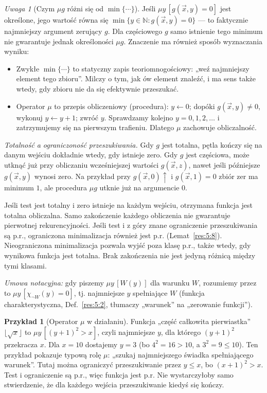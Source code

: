 \documentclass[11pt,a4paper]{article}
\numberwithin{equation}{section}
\theoremstyle{plain}
\theoremstyle{definition}
\newtheorem{przyklad}[twierdzenie]{Przykład}
\theoremstyle{remark}
\newtheorem{uwaga}[twierdzenie]{Uwaga}
\begin{document}
\begin{uwaga}[Czym $\mu g$ różni się od $\min\{\cdots\}$]\label{res:5:6}
Jeśli $\mu y\,[g(\vec x,y)=0]$ jest określone, jego wartość równa się $\min\{y\in\mathbb N:g(\vec x,y)=0\}$ --- to faktycznie najmniejszy argument zerujący $g$. Dla częściowego $g$ samo istnienie tego minimum nie gwarantuje jednak określoności $\mu g$. Znaczenie ma również sposób wyznaczania wyniku:
\begin{itemize}
\item Zwykłe $\min\{\cdots\}$ to statyczny zapis teoriomnogościowy: „weź najmniejszy element tego zbioru”. Milczy o tym, jak ów element znaleźć, i ma sens także wtedy, gdy zbioru nie da się efektywnie przeszukać.
\item Operator $\mu$ to przepis obliczeniowy (procedura): $y\gets0$; dopóki $g(\vec x,y)\ne0$, wykonuj $y\gets y+1$; zwróć $y$. Sprawdzamy kolejno $y=0,1,2,\ldots$ i zatrzymujemy się na pierwszym trafieniu. Dlatego $\mu$ zachowuje obliczalność.
\end{itemize}
\emph{Totalność a ograniczoność przeszukiwania.} Gdy $g$ jest totalna, pętla kończy się na danym wejściu dokładnie wtedy, gdy istnieje zero. Gdy $g$ jest częściowa, może utknąć już przy obliczaniu wcześniejszej wartości $g(\vec x,z)$, nawet jeśli późniejsze $g(\vec x,y)$ wynosi zero. Na przykład przy $g(\vec x,0)\uparrow$ i $g(\vec x,1)=0$ zbiór zer ma minimum $1$, ale procedura $\mu g$ utknie już na argumencie $0$.

Jeśli test jest totalny i zero istnieje na każdym wejściu, otrzymana funkcja jest totalna obliczalna. Samo zakończenie każdego obliczenia nie gwarantuje pierwotnej rekurencyjności. Jeśli test i z góry znane ograniczenie przeszukiwania są p.r., ograniczona minimalizacja również jest p.r. (Lemat~\ref{res:5:8}). Nieograniczona minimalizacja pozwala wyjść poza klasę p.r., także wtedy, gdy wynikowa funkcja jest totalna. Brak zakończenia nie jest jedyną różnicą między tymi klasami.

\emph{Umowa notacyjna:} gdy piszemy $\mu y\,[W(y)]$ dla warunku $W$, rozumiemy przez to $\mu y\,[\chi_{\neg W}(y)=0]$, tj. najmniejsze $y$ spełniające $W$ (funkcja charakterystyczna, Def.~\ref{res:5:2}, tłumaczy „warunek” na „zerowanie funkcji”).
\end{uwaga}

\begin{przyklad}[Operator $\mu$ w działaniu]\label{res:5:7}
Funkcja „część całkowita pierwiastka” $\lfloor\sqrt x\rfloor$ to $\mu y\,[(y+1)^2>x]$, czyli najmniejsze $y$, dla którego $(y+1)^2$ przekracza $x$. Dla $x=10$ dostajemy $y=3$ (bo $4^2=16>10$, a $3^2=9\le10$). Ten przykład pokazuje typową rolę $\mu$: „szukaj najmniejszego świadka spełniającego warunek”. Tutaj można ograniczyć przeszukiwanie przez $y\le x$, bo $(x+1)^2>x$. Test i ograniczenie są p.r., więc funkcja jest p.r. Nie wystarczyłoby samo stwierdzenie, że dla każdego wejścia przeszukiwanie kiedyś się kończy.
\end{przyklad}
\end{document}
